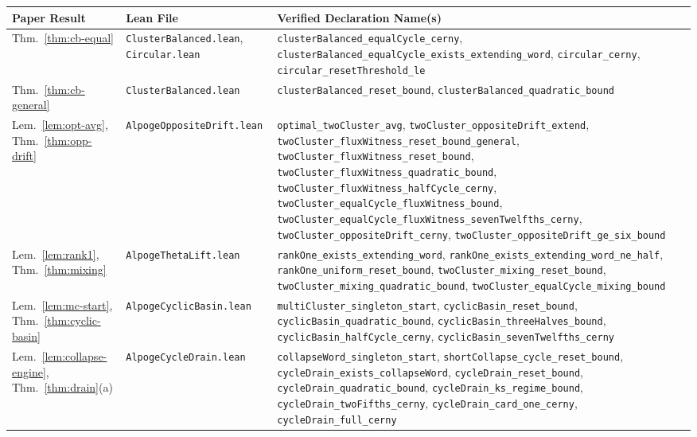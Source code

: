\documentclass[11pt,a4paper]{article}
\theoremstyle{definition}
\theoremstyle{remark}
\newcommand{\us}{\_\allowbreak}
\begin{document}
\begin{table}[tbp]
\centering
\scriptsize
\renewcommand{\arraystretch}{1.22}
\begin{tabular}{@{} >{\raggedright\arraybackslash}p{2.2cm} >{\raggedright\arraybackslash}p{3.6cm} >{\raggedright\arraybackslash}p{9.1cm} @{}}
\toprule
\textbf{Paper Result} & \textbf{Lean File} & \textbf{Verified Declaration Name(s)} \\
\midrule
Thm.~\ref{thm:cb-equal} & \texttt{ClusterBalanced.lean}, \texttt{Circular.lean} & \texttt{clusterBalanced\us equalCycle\us cerny}, \texttt{clusterBalanced\us equalCycle\us exists\us extending\us word}, \texttt{circular\us cerny}, \texttt{circular\us resetThreshold\us le} \\
Thm.~\ref{thm:cb-general} & \texttt{ClusterBalanced.lean} & \texttt{clusterBalanced\us reset\us bound}, \texttt{clusterBalanced\us quadratic\us bound} \\
Lem.~\ref{lem:opt-avg}, Thm.~\ref{thm:opp-drift} & \texttt{AlpogeOppositeDrift.lean} & \texttt{optimal\us twoCluster\us avg}, \texttt{twoCluster\us oppositeDrift\us extend}, \texttt{twoCluster\us fluxWitness\us reset\us bound\us general}, \texttt{twoCluster\us fluxWitness\us reset\us bound}, \texttt{twoCluster\us fluxWitness\us quadratic\us bound}, \texttt{twoCluster\us fluxWitness\us halfCycle\us cerny}, \texttt{twoCluster\us equalCycle\us fluxWitness\us bound}, \texttt{twoCluster\us equalCycle\us fluxWitness\us sevenTwelfths\us cerny}, \texttt{twoCluster\us oppositeDrift\us cerny}, \texttt{twoCluster\us oppositeDrift\us ge\us six\us bound} \\
Lem.~\ref{lem:rank1}, Thm.~\ref{thm:mixing} & \texttt{AlpogeThetaLift.lean} & \texttt{rankOne\us exists\us extending\us word}, \texttt{rankOne\us exists\us extending\us word\us ne\us half}, \texttt{rankOne\us uniform\us reset\us bound}, \texttt{twoCluster\us mixing\us reset\us bound}, \texttt{twoCluster\us mixing\us quadratic\us bound}, \texttt{twoCluster\us equalCycle\us mixing\us bound} \\
Lem.~\ref{lem:mc-start}, Thm.~\ref{thm:cyclic-basin} & \texttt{AlpogeCyclicBasin.lean} & \texttt{multiCluster\us singleton\us start}, \texttt{cyclicBasin\us reset\us bound}, \texttt{cyclicBasin\us quadratic\us bound}, \texttt{cyclicBasin\us threeHalves\us bound}, \texttt{cyclicBasin\us halfCycle\us cerny}, \texttt{cyclicBasin\us sevenTwelfths\us cerny} \\
Lem.~\ref{lem:collapse-engine}, Thm.~\ref{thm:drain}(a) & \texttt{AlpogeCycleDrain.lean} & \texttt{collapseWord\us singleton\us start}, \texttt{shortCollapse\us cycle\us reset\us bound}, \texttt{cycleDrain\us exists\us collapseWord}, \texttt{cycleDrain\us reset\us bound}, \texttt{cycleDrain\us quadratic\us bound}, \texttt{cycleDrain\us ks\us regime\us bound}, \texttt{cycleDrain\us twoFifths\us cerny}, \texttt{cycleDrain\us card\us one\us cerny}, \texttt{cycleDrain\us full\us cerny} \\

\end{tabular}
\end{table}
\end{document}
